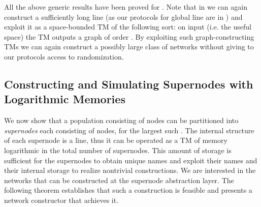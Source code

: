 \documentclass[oribibl, 11pt]{llncs}
\begin{document}
\begin{remark}
All the above generic results have been proved for . Note that in  we can again construct a sufficiently long line (as our protocols for global line are in ) and exploit it as a space-bounded TM of the following sort: on input  (i.e. the useful space) the TM outputs a graph of order . By exploiting such graph-constructing TMs we can again construct a possibly large class of networks without giving to our protocols access to randomization.
\end{remark}

\subsection{Constructing and Simulating Supernodes with Logarithmic Memories}

We now show that a population consisting of  nodes can be partitioned into  \emph{supernodes} each consisting of  nodes, for the largest such . The internal structure of each supernode is a line, thus it can be operated as a TM of memory logarithmic in the total number of supernodes. This amount of storage is sufficient for the supernodes to obtain unique names and exploit their names and their internal storage to realize nontrivial constructions. We are interested in the networks that can be constructed at the supernode abstraction layer. The following theorem establishes that such a construction is feasible and presents a network constructor that achieves it.  
\end{document}

